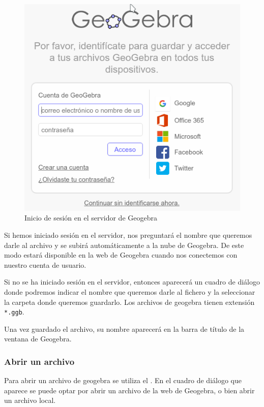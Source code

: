 \begin{figure}[h!]
\begin{center}
\includegraphics[scale=0.6]{img/introduccion/login}
\caption{Inicio de sesión en el servidor de Geogebra} \label{g:login}
\end{center}
\end{figure}

Si hemos iniciado sesión en el servidor, nos preguntará el nombre que queremos darle al archivo y se subirá automáticamente a la nube de Geogebra.
De este modo estará disponible en la web de Geogebra cuando nos conectemos con nuestro cuenta de usuario.

Si no se ha iniciado sesión en el servidor, entonces aparecerá un cuadro de diálogo donde podremos indicar el nombre que queremos darle al fichero y la seleccionar la carpeta donde queremos guardarlo.
Los archivos de geogebra tienen extensión \texttt{*.ggb}.

Una vez guardado el archivo, su nombre aparecerá en la barra de título de la ventana de Geogebra.


\subsubsection*{Abrir un archivo}
Para abrir un archivo de geogebra se utiliza el .
En el cuadro de diálogo que aparece se puede optar por abrir un archivo de la web de Geogebra, o bien abrir un archivo local.

